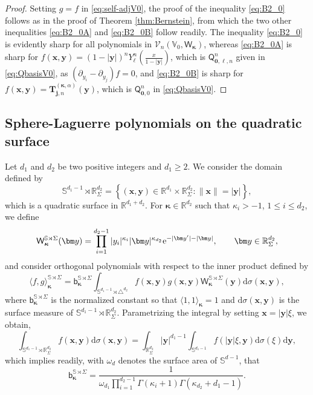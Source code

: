 \documentclass{amsart}
\theoremstyle{remark}
\def\la{{\langle}}
\def\ra{{\rangle}}
\def\d{\mathrm{d}}
\def\e{\mathrm{e}}
\def\sph{{\mathbb{S}^{d-1}}}
\def\sb{{\mathsf b}}
\def\sQ{{\mathsf Q}}
\def\sW{{\mathsf W}}
\def\k{{\kappa}}
\def\o{{\omega}}
\def\s{\sigma}
\def\la{{\langle}}
\def\ra{{\rangle}}
\def\xb{{\bm x}}
\def\yb{{\bm y}}
\def\CV{{\mathcal V}}
\def\BB{{\mathbb B}}
\def\RR{{\mathbb R}}
\def\SS{{\mathbb S}}
\def\VV{{\mathbb V}}
\def\bk{{\boldsymbol{\kappa}}}
\begin{document}
\begin{proof}
Setting $g = f$ in \eqref{eq:self-adjV0}, the proof of the inequality \eqref{eq:B2_0} follows as in the proof 
of Theorem \ref{thm:Bernstein}, from which the two other inequalities \eqref{eq:B2_0A} and \eqref{eq:B2_0B}
follow readily. The inequality \eqref{eq:B2_0} is evidently sharp for all polynomials in $\CV_n(\VV_0, \sW_\bk)$,
whereas \eqref{eq:B2_0A} is sharp for $f(\bm x, \bm y) =  (1-|\bm y|)^n Y_\ell^n(\frac{x}{1-|\bm y|})$, which 
is $\sQ_{\bm 0, \ell, n}^n$ given in \eqref{eq:QbasisV0}, as $(\partial_{y_i} - \partial_{y_j}) f =0$, and \eqref{eq:B2_0B} 
is sharp for $f(\bm x, \bm y) = \bm T_{\bm j, n}^{(\bk, \alpha)}(\bm y)$, which is $\sQ_{\bm 0, 0}^n$ in \eqref{eq:QbasisV0}.
\end{proof}

\fi

\subsection{Sphere-Laguerre polynomials on the quadratic surface}
Let $d_1$ and $d_2$ be two positive integers and $d_1 \ge 2$. We consider the domain defined by
$$
\SS^{d_1-1} \!\rtimes \RR_\Sigma^{d_2} = \left\{(\bm x,\bm y) \in \RR^{d_1} \times \RR_\Sigma^{d_2}: \|\bm x\| = |\bm y|\right\},
$$
which is a quadratic surface in $\RR^{d_1+d_2}$. For $\bm\kappa \in \RR^{d_2}$ such that $\k_i > -1$, $1 \le i \le d_2$,
we define  
$$
  {\sf W}_{\bk}^{\SS \rtimes \Sigma} (\bm y) =  \prod_{i=1}^{d_2-1} |y_i|^{\k_i} |\bm y|^{\k_{d_2}} \e^{-|\yb'|-|\yb|}, 
  \qquad \yb \in \RR_\Sigma^{d_2},
$$
and consider orthogonal polynomials with respect to the inner product defined by 
\begin{equation} \label{eq:ipd_SL0}
  \la f, g\ra_{\bk}^{\SS\rtimes \Sigma}   = \sb_{\bk}^{\SS \rtimes \Sigma}  \int_{\SS^{d_1-1} \!\rtimes \triangle^{d_2}} f(\bm x,\bm y) g(\bm x,\bm y) 
       \sW_{\bk}^{\SS \rtimes \Sigma}  (\bm y) \d \s(\bm x, \bm y), 
\end{equation}
where $\sb_{\bk}^{\SS \rtimes \Sigma}$ is the normalized constant so that $ \la 1, 1\ra_{\bk} =1$ and $\d \s(\bm x, \bm y)$ is the
surface measure of $\SS^{d_1-1} \!\rtimes \RR_\Sigma^{d_2}$. Parametrizing the integral by setting
$\xb = |\yb| \xi$, we obtain, 
$$
   \int_{\SS^{d_1-1} \!\rtimes \RR_\Sigma^{d_2}} f(\xb,\yb) \d \s (\xb,\yb) = 
   \int_{\RR_\Sigma^{d_2}} |\yb|^{d_1-1} \int_{\SS^{d_1-1}} f(|\yb| \xi, \yb) \d\s(\xi) \d \yb,
$$
which implies readily, with $\o_d$ denotes the surface area of $\sph$, that
$$
   \sb_{\bk}^{\SS \rtimes \Sigma}  = \frac{1}{\omega_{d_1} \prod_{i=1}^{d_2-1} \Gamma(\k_i +1) \Gamma(\k_{d_2} + d_1 -1)}.
$$
\end{document}
